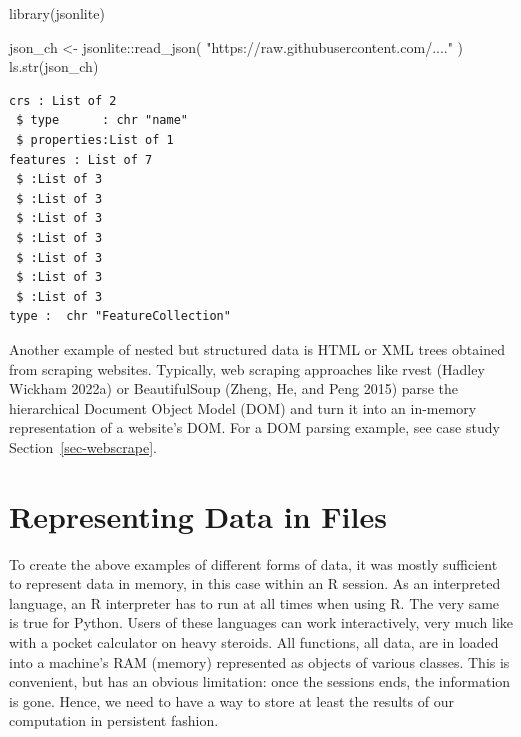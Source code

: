 \documentclass[
  12pt,
  letterpaper,
]{krantz}
\newenvironment{Shaded}{\begin{snugshade}}{\end{snugshade}}
\newcommand{\FunctionTok}[1]{\textcolor[rgb]{0.28,0.35,0.67}{#1}}
\newcommand{\NormalTok}[1]{\textcolor[rgb]{0.00,0.23,0.31}{#1}}
\newcommand{\OtherTok}[1]{\textcolor[rgb]{0.00,0.23,0.31}{#1}}
\newcommand{\SpecialCharTok}[1]{\textcolor[rgb]{0.37,0.37,0.37}{#1}}
\newcommand{\StringTok}[1]{\textcolor[rgb]{0.13,0.47,0.30}{#1}}
\begin{document}
\normalsize

\begin{Shaded}
\begin{Highlighting}[]
\FunctionTok{library}\NormalTok{(jsonlite)}

\NormalTok{json\_ch }\OtherTok{\textless{}{-}}\NormalTok{ jsonlite}\SpecialCharTok{::}\FunctionTok{read\_json}\NormalTok{(}
  \StringTok{"https://raw.githubusercontent.com/...."}
\NormalTok{)}
\FunctionTok{ls.str}\NormalTok{(json\_ch)}
\end{Highlighting}
\end{Shaded}

\normalsize

\normalsize

\begin{verbatim}
crs : List of 2
 $ type      : chr "name"
 $ properties:List of 1
features : List of 7
 $ :List of 3
 $ :List of 3
 $ :List of 3
 $ :List of 3
 $ :List of 3
 $ :List of 3
 $ :List of 3
type :  chr "FeatureCollection"
\end{verbatim}

\normalsize

Another example of nested but structured data is HTML or XML
trees obtained from scraping websites. Typically, web scraping
approaches like rvest (Hadley Wickham 2022a) or BeautifulSoup (Zheng,
He, and Peng 2015) parse the hierarchical Document Object Model (DOM)
and turn it into an in-memory representation of a website's DOM. For a
DOM parsing example, see case study Section~\ref{sec-webscrape}.

\hypertarget{representing-data-in-files}{%
\section{Representing Data in Files}\label{representing-data-in-files}}

To create the above examples of different forms of data, it was mostly
sufficient to represent data in memory, in this case within an R
session. As an interpreted language, an R interpreter has to run at all
times when using R. The very same is true for Python. Users of these
languages can work interactively, very much like with a pocket
calculator on heavy steroids. All functions, all data, are in loaded
into a machine's RAM (memory) represented as objects of various classes.
This is convenient, but has an obvious limitation: once the sessions
ends, the information is gone. Hence, we need to have a way to store at
least the results of our computation in persistent fashion.
\end{document}
